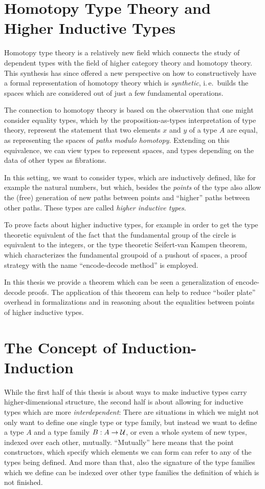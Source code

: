 \section{Homotopy Type Theory and Higher Inductive Types}

Homotopy type theory is a relatively new field which connects the study of
dependent types with the field of higher category theory and homotopy theory.
This synthesis has since offered a new perspective on how to constructively
have a formal representation of homotopy theory which is \emph{synthetic},
i.\,e.\ builds the spaces which are considered out of just a few fundamental
operations.

The connection to homotopy theory is based on the observation that one might
consider equality types, which by the proposition-as-types interpretation of type
theory, represent the statement that two elements $x$ and $y$ of a type $A$
are equal, as representing the spaces of \emph{paths modulo homotopy}.
Extending on this equivalence, we can view types to represent spaces,
and types depending on the data of other types as fibrations.

In this setting, we want to consider types, which are inductively defined,
like for example the natural numbers, but which, besides the \emph{points}
of the type also allow the (free) generation of new paths between points
and ``higher'' paths between
other paths.
These types are called \emph{higher inductive types}.

To prove facts about higher inductive types, for example in order to get the
type theoretic equivalent of the fact that the fundamental group of the circle
is equivalent to the integers, or the type theoretic Seifert-van Kampen theorem,
which characterizes the fundamental groupoid of a pushout of spaces,
a proof strategy with the name ``encode-decode method'' is employed.

In this thesis we provide a theorem which can be seen a generalization of
encode-decode proofs.
The application of this theorem can help to reduce ``boiler plate'' overhead
in formalizations and in reasoning about the equalities between points
of higher inductive types.

\section{The Concept of Induction-Induction}\label{sec:intro-iit}

While the first half of this thesis is about ways to make inductive types carry
higher-dimensional structure, the second half is about allowing for inductive types
which are more \emph{interdependent}:
There are situations in which we might not only want to define one single type
or type family, but instead we want to define a type $A$ and a type family $B : A \to \mathcal{U}$,
or even a whole system of new types, indexed over each other,
mutually.
``Mutually'' here means that the point constructors, which specify which elements
we can form can refer to any of the types being defined.
And more than that, also the signature of the type families which we define can
be indexed over other type families the definition of which is not finished.

